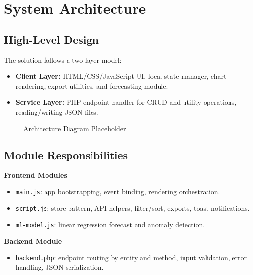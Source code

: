 \documentclass[conference]{IEEEtran}
\begin{document}
\section{System Architecture}
\subsection{High-Level Design}
The solution follows a two-layer model:
\begin{itemize}
    \item \textbf{Client Layer:} HTML/CSS/JavaScript UI, local state manager, chart rendering, export utilities, and forecasting module.
    \item \textbf{Service Layer:} PHP endpoint handler for CRUD and utility operations, reading/writing JSON files.
\end{itemize}

\begin{figure}[H]
\centering
{}
\caption{Architecture Diagram Placeholder}
\label{fig:arch}
\end{figure}

\subsection{Module Responsibilities}
\textbf{Frontend Modules}
\begin{itemize}
    \item \texttt{main.js}: app bootstrapping, event binding, rendering orchestration.
    \item \texttt{script.js}: store pattern, API helpers, filter/sort, exports, toast notifications.
    \item \texttt{ml-model.js}: linear regression forecast and anomaly detection.
\end{itemize}

\textbf{Backend Module}
\begin{itemize}
    \item \texttt{backend.php}: endpoint routing by entity and method, input validation, error handling, JSON serialization.
\end{itemize}
\end{document}
